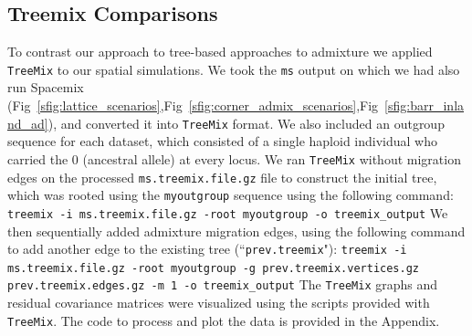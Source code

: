 \documentclass[10pt,letterpaper]{article}
\begin{document}
\subsection*{Treemix Comparisons}
To contrast our approach to tree-based approaches to admixture we
applied \texttt{TreeMix} \cite{Treemix} to our spatial simulations.
%
We took the \texttt{ms} output on which we had also run Spacemix 
(Fig\ \ref{sfig:lattice_scenarios},Fig\ \ref{sfig:corner_admix_scenarios},Fig\ \ref{sfig:barr_inland_ad}), 
and converted it into \texttt{TreeMix} format.  
We also included an outgroup sequence for each dataset,
 which consisted of a single haploid individual who carried the $0$ (ancestral allele) at every locus. 
 We ran \texttt{TreeMix} without migration edges on the processed \texttt{ms.treemix.file.gz} file to construct the initial
tree, which was rooted using the \texttt{myoutgroup} sequence using the following command:
\hspace*{\fill}\newline\hspace*{\fill}\newline
\texttt{treemix -i ms.treemix.file.gz  -root myoutgroup -o treemix\_output}
\hspace*{\fill}\newline\hspace*{\fill}\newline
We then sequentially added admixture migration edges, 
using the following command to add another edge to the existing tree (``\texttt{prev.treemix}"):
\hspace*{\fill}\newline\hspace*{\fill}\newline
\texttt{treemix -i  ms.treemix.file.gz -root myoutgroup  -g  prev.treemix.vertices.gz  prev.treemix.edges.gz -m 1 -o  treemix\_output}
\hspace*{\fill}\newline\hspace*{\fill}\newline
The \texttt{TreeMix} graphs and residual covariance matrices were visualized
using the scripts provided with \texttt{TreeMix}. 
The code to process and plot the data is provided in the Appendix.\\
\end{document}

